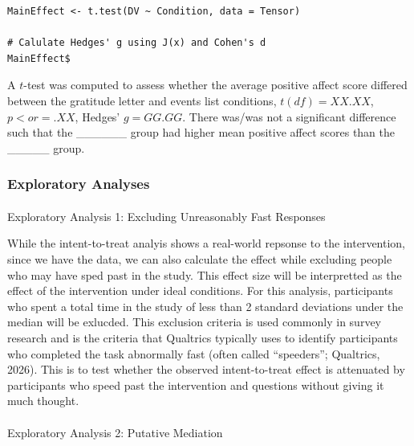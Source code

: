\documentclass[
  letterpaper,
  DIV=11,
  numbers=noendperiod]{scrartcl}
\makeatletter
\let\oldparagraph\paragraph
\renewcommand{\paragraph}{
    \@ifstar
      \xxxParagraphStar
      \xxxParagraphNoStar
  }
\newcommand{\xxxParagraphStar}[1]{\oldparagraph*{#1}\mbox{}}
\newcommand{\xxxParagraphNoStar}[1]{\oldparagraph{#1}\mbox{}}
\makeatother
\begin{document}
\begin{verbatim}
MainEffect <- t.test(DV ~ Condition, data = Tensor)

# Calulate Hedges' g using J(x) and Cohen's d
MainEffect$
\end{verbatim}

A \(t\)-test was computed to assess whether the average positive affect
score differed between the gratitude letter and events list conditions,
\(t(df)=XX.XX\), \(p <or = .XX\), Hedges' \(g = GG.GG\). There was/was
not a significant difference such that the \_\_\_\_\_\_ group had higher
mean positive affect scores than the \_\_\_\_\_ group.

\subsubsection{Exploratory Analyses}\label{exploratory-analyses}

\paragraph{Exploratory Analysis 1: Excluding Unreasonably Fast
Responses}\label{exploratory-analysis-1-excluding-unreasonably-fast-responses}

While the intent-to-treat analyis shows a real-world repsonse to the
intervention, since we have the data, we can also calculate the effect
while excluding people who may have sped past in the study. This effect
size will be interpretted as the effect of the intervention under ideal
conditions. For this analysis, participants who spent a total time in
the study of less than 2 standard deviations under the median will be
exlucded. This exclusion criteria is used commonly in survey research
and is the criteria that Qualtrics typically uses to identify
participants who completed the task abnormally fast (often called
``speeders''; Qualtrics, 2026). This is to test whether the observed
intent-to-treat effect is attenuated by participants who speed past the
intervention and questions without giving it much thought.

\paragraph{Exploratory Analysis 2: Putative
Mediation}\label{exploratory-analysis-2-putative-mediation}
\end{document}
